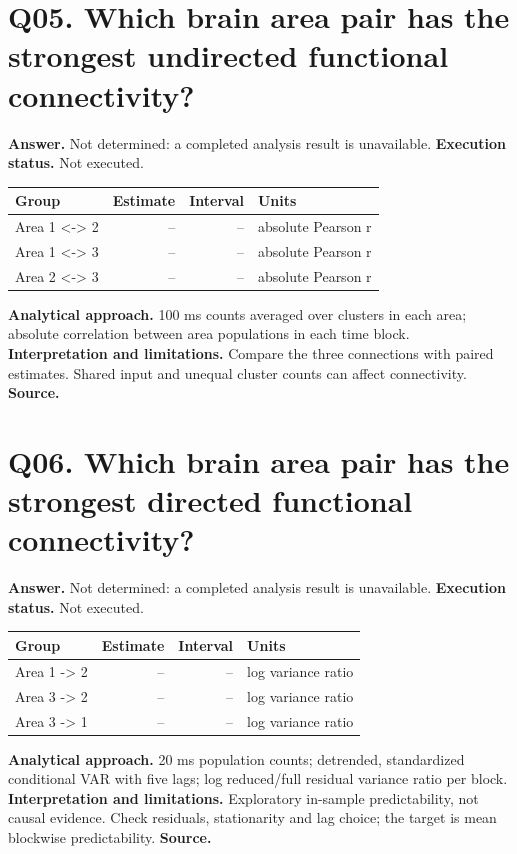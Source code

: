 \documentclass[11pt,a4paper]{article}
\begin{document}
\section*{Q05. Which brain area pair has the strongest undirected functional connectivity?}
\textbf{Answer.} Not determined: a completed analysis result is unavailable.
\textbf{Execution status.} Not executed.
\begin{tabularx}{\linewidth}{XrrX}\toprule Group & Estimate & Interval & Units \\\midrule
Area 1 \textless{}-\textgreater{} 2 & -- & -- & absolute Pearson r \\
Area 1 \textless{}-\textgreater{} 3 & -- & -- & absolute Pearson r \\
Area 2 \textless{}-\textgreater{} 3 & -- & -- & absolute Pearson r \\
\bottomrule\end{tabularx}
\textbf{Analytical approach.} 100 ms counts averaged over clusters in each area; absolute correlation between area populations in each time block.
\textbf{Interpretation and limitations.} Compare the three connections with paired estimates. Shared input and unequal cluster counts can affect connectivity.
\textbf{Source.} 
\clearpage
\section*{Q06. Which brain area pair has the strongest directed functional connectivity?}
\textbf{Answer.} Not determined: a completed analysis result is unavailable.
\textbf{Execution status.} Not executed.
\begin{tabularx}{\linewidth}{XrrX}\toprule Group & Estimate & Interval & Units \\\midrule
Area 1 -\textgreater{} 2 & -- & -- & log variance ratio \\
Area 3 -\textgreater{} 2 & -- & -- & log variance ratio \\
Area 3 -\textgreater{} 1 & -- & -- & log variance ratio \\
\bottomrule\end{tabularx}
\textbf{Analytical approach.} 20 ms population counts; detrended, standardized conditional VAR with five lags; log reduced/full residual variance ratio per block.
\textbf{Interpretation and limitations.} Exploratory in-sample predictability, not causal evidence. Check residuals, stationarity and lag choice; the target is mean blockwise predictability.
\textbf{Source.} 
\clearpage
\end{document}

